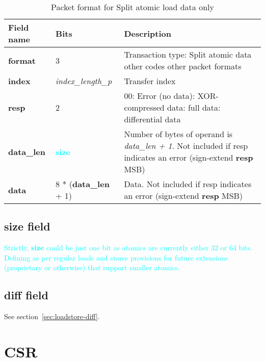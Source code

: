\begin{table}[htp]
  \centering
  \caption{Packet format for Split atomic load data only}
  \label{tab:te_datadx0y9}
  \begin{tabulary}{\textwidth}{|l|p{38mm}|p{92mm}|}
    \hline
    {\bf Field name} & {\bf Bits} & {\bf Description} \\
    \hline
    \textbf{format} & 	3	& Transaction type: Split atomic data\newline	
		other codes other packet formats\\
    \hline
    \textbf{index} & \textit{index\_length\_p} & Transfer index\\
    \textbf{resp} & 2 & 00: Error (no data):  XOR-compressed data: full data: differential data\\
    \hline
    \textbf{data\_len} & \textcolor{cyan}{\textbf{size}} &	Number of bytes of operand is \textit{data\_len + 1}. Not included if resp indicates an error (sign-extend \textbf{resp} MSB)\\
    \hline
    \textbf{data} &  8 * (\textbf{data\_len} + 1) & Data. Not included if resp indicates an error (sign-extend \textbf{resp} MSB)\\
    \hline
  \end{tabulary}
\end{table}

\subsection{size field} \label{sec:atomic-size}

\textcolor{cyan}{Strictly, \textbf{size} could be just one bit as atomics are currently either 32 or 64 bits.  
Defining as per regular loads and stores provisions for future extensions (proprietary or otherwise) that support smaller atomics.}

\subsection{diff field} \label{sec:atomic-diff}

See section~\ref{sec:loadstore-diff}.

\FloatBarrier
\section{CSR} \label{sec:data-csr}

